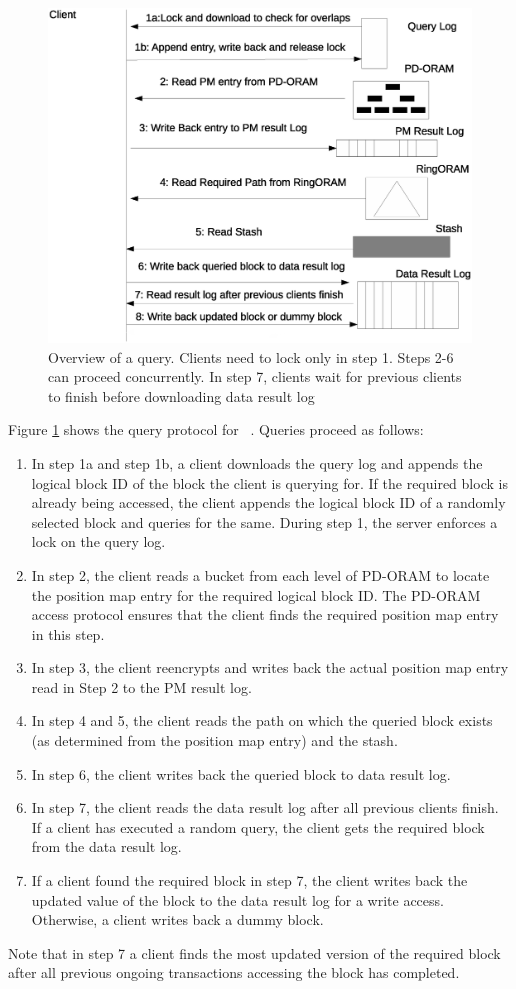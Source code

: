 \begin{figure}
 \includegraphics[scale=0.30]{Figures/Query_overview.eps}
 \caption{Overview of a query. Clients need to lock only in step 1. Steps 2-6 can proceed concurrently. In step 7, clients wait for previous clients to finish before downloading
 data result log \label{query_overview}}
\end{figure}




Figure \ref{query_overview} shows the query protocol for \sysname~. Queries proceed as follows: 
\begin{enumerate}
 \item In step 1a and step 1b, a client downloads the query log and appends the logical block ID of the block the client is querying for. If the required block 
 is already being accessed, the client appends the logical block ID of a randomly selected block and queries for the same. During step 1, the server enforces a 
 lock on the query log.
 \item In step 2, the client reads a bucket from each level of PD-ORAM to locate the position map entry for the required logical block ID. The PD-ORAM access protocol 
 ensures that the client finds the required position map entry in this step. 
 \item In step 3, the client reencrypts and writes back the actual position map entry read in Step 2 to the PM result log.
 \item In step 4 and 5, the client reads the path on which the queried block exists (as determined from the position map entry) and the stash. 
 \item In step 6, the client writes back the queried block to data result log.
 \item In step 7, the client reads the data result log after all previous clients finish. If a client has executed 
 a random query, the client gets the required block from the data result log. 
 \item If a client found the required block in step 7, the client writes back the updated value of the block to the 
 data result log for a write access. Otherwise, a client writes back a dummy block.
\end{enumerate}

Note that in step 7 a client finds the most updated version of the 
required block after all previous ongoing transactions accessing the block has completed. 

